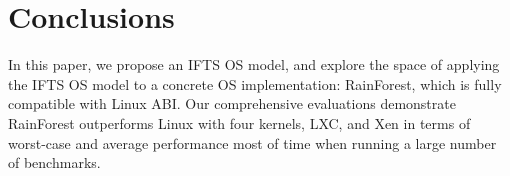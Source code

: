 \documentclass[pageno]{jpaper}
\begin{document}
\section{Conclusions}

In this paper, we propose an IFTS OS model, and explore the space of applying the IFTS OS model to a concrete OS implementation:  RainForest, which is  fully compatible with Linux ABI. Our comprehensive evaluations  demonstrate RainForest outperforms Linux with four kernels, LXC, and Xen in terms of worst-case and average performance most of time when running a large number of benchmarks. 























 


\end{document}
